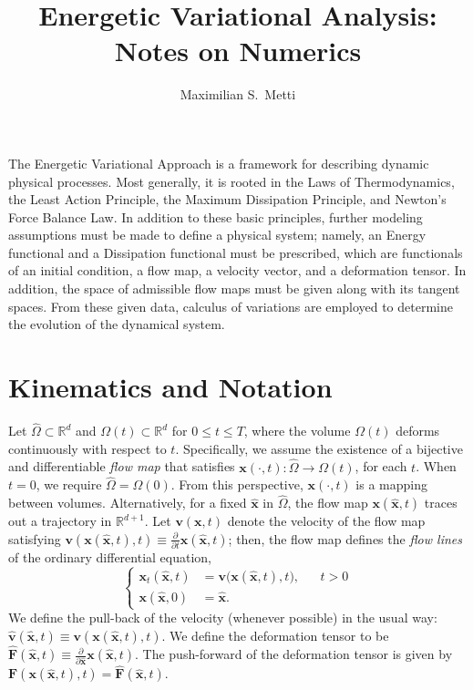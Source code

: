 \documentclass[final,10pt]{article}
\begin{document}
\title{Energetic Variational Analysis: Notes on Numerics}
\author{Maximilian S.~Metti}
\maketitle


The Energetic Variational Approach is a framework for describing dynamic physical processes.
Most generally, it is rooted in the Laws of Thermodynamics,
the Least Action Principle, the Maximum Dissipation Principle, and Newton's Force Balance Law.
In addition to these basic principles, further modeling assumptions must be made to define a physical system;
namely, an Energy functional and a Dissipation functional must be prescribed,
which are functionals of an initial condition, a flow map, a velocity vector, and a deformation tensor.
In addition, the space of admissible flow maps must be given along with its tangent spaces.
From these given data, calculus of variations are employed to determine the evolution of the dynamical system.


\section{Kinematics and Notation}

Let $\hat{\Omega} \subset \mathbb{R}^d$ and $\Omega(t) \subset \mathbb{R}^d$ for $0 \le t \le T$,
where the volume $\Omega(t)$ deforms continuously with respect to $t$.
Specifically, we assume the existence of a bijective and differentiable \emph{flow map}
that satisfies $\bm{x}(\cdot,t): \hat{\Omega}\rightarrow\Omega(t)$, for each $t$.
When $t=0$, we require $\hat{\Omega} = \Omega(0)$.
From this perspective, $\bm x(\cdot,t)$ is a mapping between volumes.
Alternatively, for a fixed $\hat{\bm x}$ in $\hat{\Omega}$, the flow map $\bm x(\hat{\bm x}, t)$ traces out a trajectory in $\mathbb{R}^{d+1}$.
Let $\bm v(\bm x,t)$ denote the velocity of the flow map satisfying $\bm v(\bm x(\hat{\bm x},t),t) \equiv  \frac{\partial}{{\partial t}}\bm x(\hat{\bm x},t)$;
then, the flow map defines the \emph{flow lines} of the ordinary differential equation,
\[
	\left\{ \begin{matrix}	\bm x_t (\hat{\bm x},t)	&= \bm v \big(\bm x(\hat{\bm x},t),t \big),	&&	t>0	\\
					\bm x (\hat{\bm x},0)	&= \hat{\bm x}.	\end{matrix} \right.
\]
We define the pull-back of the velocity (whenever possible) in the usual way: $\hat{ \bm v}(\hat{\bm x},t) \equiv \bm v(\bm x(\hat{ \bm x},t),t)$.
We define the deformation tensor to be $\hat{\bm F}(\hat{\bm x},t) \equiv \frac{\partial}{{\partial \hat{\bm x}}}\bm x(\hat{\bm x},t)$.
The push-forward of the deformation tensor is given by $\bm F(\bm x(\hat{\bm x},t),t) = \hat{\bm F}(\hat{\bm x},t)$.
\end{document}
